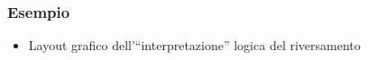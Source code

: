 \documentclass[compress,xcolor=dvipsnames]{beamer}
\begin{document}
\begin{frame}
	\frametitle{Esempio }

	\begin{center}
    {}
	\end{center}

	\begin{itemize}

		\item Layout grafico dell'``interpretazione'' logica del riversamento

	\end{itemize}

\end{frame}

% 
% 
% 
% 
% 
% 	
% 
% 
% 
% 
% 
% 
% 
\end{document}
